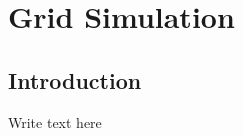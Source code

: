 \graphicspath{{chapt_dutch/}{intro/}{chapt2/}{chapt3/}{chapt4/}{chapt5/}}

\renewcommand\evenpagerightmark{{\scshape\small Chapter 3}}
\renewcommand\oddpageleftmark{{\scshape\small Grid Simulation}}

\renewcommand{\bibname}{References}

\hyphenation{}

\chapter[Grid Simulation]%
 {Grid Simulation}
\label{ch3}

\section{Introduction}

Write text here

\lipsum

\clearpage




\clearpage{\pagestyle{empty}\cleardoublepage}
